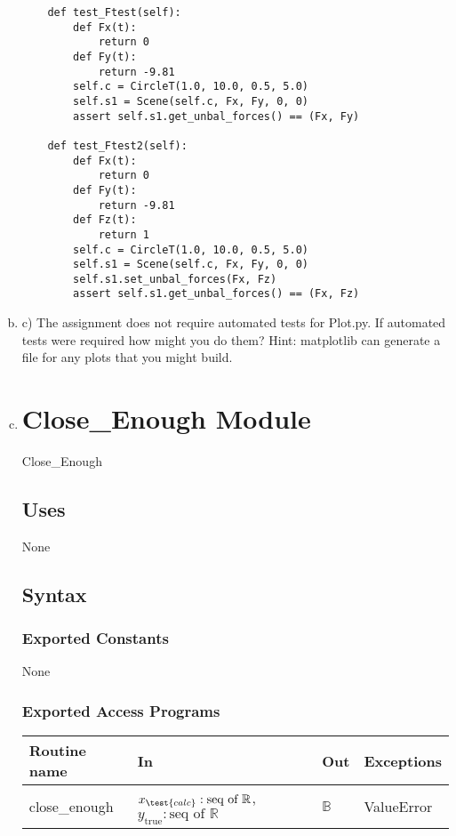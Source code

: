 \documentclass[12pt]{article}
\begin{document}
\begin{enumerate}[a)]
\begin{verbatim}
    def test_Ftest(self):
        def Fx(t):
            return 0
        def Fy(t):
            return -9.81
        self.c = CircleT(1.0, 10.0, 0.5, 5.0)
        self.s1 = Scene(self.c, Fx, Fy, 0, 0)
        assert self.s1.get_unbal_forces() == (Fx, Fy)

    def test_Ftest2(self):
        def Fx(t):
            return 0
        def Fy(t):
            return -9.81
        def Fz(t):
            return 1
        self.c = CircleT(1.0, 10.0, 0.5, 5.0)
        self.s1 = Scene(self.c, Fx, Fy, 0, 0)
        self.s1.set_unbal_forces(Fx, Fz)
        assert self.s1.get_unbal_forces() == (Fx, Fz)
\end{verbatim}

\item c) The assignment does not require automated tests for Plot.py. If automated tests were required how might you do them? Hint: matplotlib can generate a file for any plots that you might build.




\item 

\section* {Close\_Enough Module}

Close\_Enough

\subsection* {Uses}

None

\subsection* {Syntax}

\subsubsection* {Exported Constants}

None

\subsubsection* {Exported Access Programs}

\begin{tabular}{| l | l | l | p{5cm} |}
  \hline
  \textbf{Routine name} & \textbf{In} & \textbf{Out} & \textbf{Exceptions}\\
  \hline
  close\_enough & $x_\test{calc}: \text{seq of }\mathbb{R}$, $y_\text{true}: \text{seq of } 
  \mathbb{R}$ & $\mathbb{B}$ & ValueError\\
  \hline
\end{tabular}


\end{enumerate}
\end{document}
